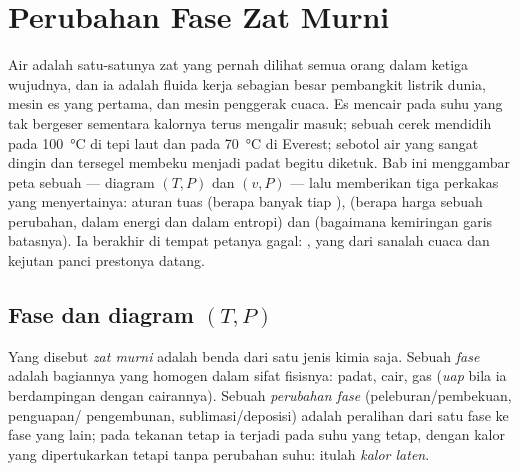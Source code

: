 \chapter{Perubahan Fase Zat Murni}\label{ch:b1:phase-changes}

Air adalah satu-satunya zat yang pernah dilihat semua orang dalam ketiga
wujudnya, dan ia adalah fluida kerja sebagian besar pembangkit listrik dunia,
 mesin es yang pertama, dan mesin penggerak cuaca.
Es mencair pada suhu yang tak bergeser sementara kalornya terus mengalir
masuk; sebuah cerek mendidih pada \qty{100}{\degreeCelsius} di tepi laut dan pada
\qty{70}{\degreeCelsius} di Everest; sebotol air yang sangat dingin dan tersegel
membeku menjadi padat begitu diketuk. Bab ini menggambar peta  sebuah
 --- diagram $(T, P)$ dan $(v, P)$ --- lalu memberikan
tiga perkakas yang menyertainya: aturan tuas (berapa banyak tiap ),
 (berapa harga sebuah perubahan, dalam energi dan dalam entropi) dan
 (bagaimana kemiringan garis batasnya). Ia berakhir
di tempat petanya gagal: , yang dari sanalah cuaca
dan kejutan panci prestonya datang.

\section{Fase dan diagram $(T, P)$}

\begin{definition}\label{def:b1:phase-changes:phase}
Yang disebut \emph{zat murni} adalah benda dari satu jenis kimia saja. Sebuah
\emph{fase} adalah bagiannya yang homogen dalam sifat fisisnya:
padat, cair, gas (\emph{uap} bila ia berdampingan dengan
cairannya). Sebuah \emph{perubahan fase} (peleburan/pembekuan, penguapan/
pengembunan, sublimasi/deposisi) adalah peralihan dari satu fase ke
fase yang lain; pada tekanan tetap ia terjadi pada suhu yang tetap, dengan kalor
yang dipertukarkan tetapi tanpa perubahan suhu: itulah \emph{kalor laten}.
\end{definition}

